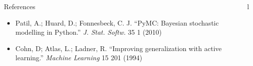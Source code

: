 \documentclass[final]{beamer}
\begin{document}
\begin{frame}{}
\begin{columns}[t]
\begin{column}{.3\linewidth}

\begin{block}{References}


\footnotesize
\begin{itemize}
\item Patil, A.; Huard, D.; Fonnesbeck, C. J. ``PyMC: Bayesian stochastic modelling in Python.'' \emph{J. Stat. Softw.} 35 1 (2010)
\item Cohn, D; Atlas, L.; Ladner, R. ``Improving generalization with active learning.'' \emph{Machine Learning} 15 201 (1994)
\end{itemize}
\end{block}

\end{column}l
\end{columns}
\end{frame}
\end{document}
